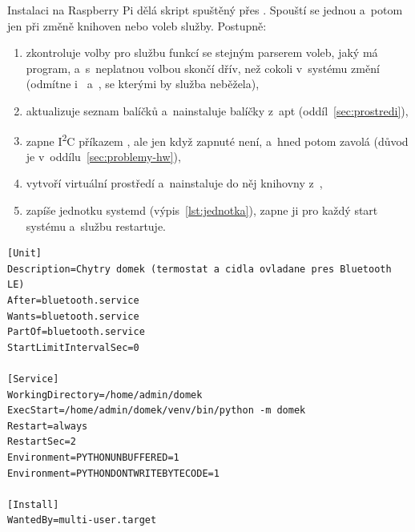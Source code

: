 Instalaci na Raspberry Pi dělá skript  spuštěný přes .
Spouští se jednou a~potom jen při změně knihoven nebo voleb služby. Postupně:
\begin{enumerate}
  \item zkontroluje volby pro službu funkcí  se stejným parserem voleb, jaký má
        program, a~s~neplatnou volbou skončí dřív, než cokoli v~systému změní (odmítne
        i~ a~, se kterými by služba neběžela),
  \item aktualizuje seznam balíčků a~nainstaluje balíčky z~apt (oddíl~\ref{sec:prostredi}),
  \item zapne I\textsuperscript{2}C příkazem , ale jen když
        zapnuté není, a~hned potom zavolá  (důvod je v~oddílu~\ref{sec:problemy-hw}),
  \item vytvoří virtuální prostředí a~nainstaluje do něj knihovny z~,
  \item zapíše jednotku systemd 
        (výpis~\ref{lst:jednotka}), zapne ji pro každý start systému a~službu restartuje.
\end{enumerate}

\begin{lstlisting}[language={}, identifierstyle={}, caption={Jednotka systemd domek.service (cesty pro uživatele admin)}, label=lst:jednotka]
[Unit]
Description=Chytry domek (termostat a cidla ovladane pres Bluetooth LE)
After=bluetooth.service
Wants=bluetooth.service
PartOf=bluetooth.service
StartLimitIntervalSec=0

[Service]
WorkingDirectory=/home/admin/domek
ExecStart=/home/admin/domek/venv/bin/python -m domek
Restart=always
RestartSec=2
Environment=PYTHONUNBUFFERED=1
Environment=PYTHONDONTWRITEBYTECODE=1

[Install]
WantedBy=multi-user.target
\end{lstlisting}

